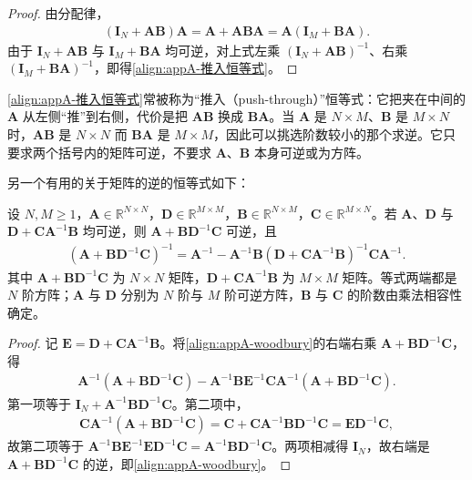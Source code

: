 \documentclass[../main.tex]{subfiles}
\begin{document}
\begin{proof}
由分配律，
\begin{align*}
 (\bm{I}_{N}+\bm{A}\bm{B})\bm{A}=\bm{A}+\bm{A}\bm{B}\bm{A}=\bm{A}(\bm{I}_{M}+\bm{B}\bm{A}).
\end{align*}
由于 $\bm{I}_{N}+\bm{A}\bm{B}$ 与 $\bm{I}_{M}+\bm{B}\bm{A}$ 均可逆，对上式左乘 $(\bm{I}_{N}+\bm{A}\bm{B})^{-1}$、右乘 $(\bm{I}_{M}+\bm{B}\bm{A})^{-1}$，即得\eqref{align:appA-推入恒等式}。
\end{proof}

\begin{remark}
\eqref{align:appA-推入恒等式}常被称为“推入（push-through）”恒等式：它把夹在中间的 $\bm{A}$ 从左侧“推”到右侧，代价是把 $\bm{A}\bm{B}$ 换成 $\bm{B}\bm{A}$。当 $\bm{A}$ 是 $N\times M$、$\bm{B}$ 是 $M\times N$ 时，$\bm{A}\bm{B}$ 是 $N\times N$ 而 $\bm{B}\bm{A}$ 是 $M\times M$，因此可以挑选阶数较小的那个求逆。它只要求两个括号内的矩阵可逆，不要求 $\bm{A}$、$\bm{B}$ 本身可逆或为方阵。
\end{remark}

另一个有用的关于矩阵的逆的恒等式如下：
\begin{proposition}\label{proposition:appA-woodbury}
设 $N,M\geqslant1$，$\bm{A}\in\mathbb{R}^{N\times N}$，$\bm{D}\in\mathbb{R}^{M\times M}$，$\bm{B}\in\mathbb{R}^{N\times M}$，$\bm{C}\in\mathbb{R}^{M\times N}$。若 $\bm{A}$、$\bm{D}$ 与 $\bm{D}+\bm{C}\bm{A}^{-1}\bm{B}$ 均可逆，则 $\bm{A}+\bm{B}\bm{D}^{-1}\bm{C}$ 可逆，且
\begin{align}
  (\bm{A}+\bm{B}\bm{D}^{-1}\bm{C})^{-1}=\bm{A}^{-1}-\bm{A}^{-1}\bm{B}(\bm{D}+\bm{C}\bm{A}^{-1}\bm{B})^{-1}\bm{C}\bm{A}^{-1}.
  \label{align:appA-woodbury}
\end{align}
其中 $\bm{A}+\bm{B}\bm{D}^{-1}\bm{C}$ 为 $N\times N$ 矩阵，$\bm{D}+\bm{C}\bm{A}^{-1}\bm{B}$ 为 $M\times M$ 矩阵。等式两端都是 $N$ 阶方阵；$\bm{A}$ 与 $\bm{D}$ 分别为 $N$ 阶与 $M$ 阶可逆方阵，$\bm{B}$ 与 $\bm{C}$ 的阶数由乘法相容性确定。
\end{proposition}

\begin{proof}
记 $\bm{E}=\bm{D}+\bm{C}\bm{A}^{-1}\bm{B}$。将\eqref{align:appA-woodbury}的右端右乘 $\bm{A}+\bm{B}\bm{D}^{-1}\bm{C}$，得
\begin{align*}
 \bm{A}^{-1}(\bm{A}+\bm{B}\bm{D}^{-1}\bm{C})-\bm{A}^{-1}\bm{B}\bm{E}^{-1}\bm{C}\bm{A}^{-1}(\bm{A}+\bm{B}\bm{D}^{-1}\bm{C}).
\end{align*}
第一项等于 $\bm{I}_{N}+\bm{A}^{-1}\bm{B}\bm{D}^{-1}\bm{C}$。第二项中，
\begin{align*}
 \bm{C}\bm{A}^{-1}(\bm{A}+\bm{B}\bm{D}^{-1}\bm{C})=\bm{C}+\bm{C}\bm{A}^{-1}\bm{B}\bm{D}^{-1}\bm{C}=\bm{E}\bm{D}^{-1}\bm{C},
\end{align*}
故第二项等于 $\bm{A}^{-1}\bm{B}\bm{E}^{-1}\bm{E}\bm{D}^{-1}\bm{C}=\bm{A}^{-1}\bm{B}\bm{D}^{-1}\bm{C}$。两项相减得 $\bm{I}_{N}$，故右端是 $\bm{A}+\bm{B}\bm{D}^{-1}\bm{C}$ 的逆，即\eqref{align:appA-woodbury}。
\end{proof}
\end{document}
